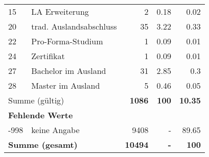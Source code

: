 \begin{longtable}{lXrrr}
     15 &
     \multicolumn{1}{X}{ LA Erweiterung   } &


       \num{2} &
       \num[round-mode=places,round-precision=2]{0.18} &
         \num[round-mode=places,round-precision=2]{0.02} \\

     20 &
     \multicolumn{1}{X}{ trad. Auslandsabschluss   } &


       \num{35} &
       \num[round-mode=places,round-precision=2]{3.22} &
         \num[round-mode=places,round-precision=2]{0.33} \\

     22 &
     \multicolumn{1}{X}{ Pro-Forma-Studium   } &


       \num{1} &
       \num[round-mode=places,round-precision=2]{0.09} &
         \num[round-mode=places,round-precision=2]{0.01} \\

     24 &
     \multicolumn{1}{X}{ Zertifikat   } &


       \num{1} &
       \num[round-mode=places,round-precision=2]{0.09} &
         \num[round-mode=places,round-precision=2]{0.01} \\

     27 &
     \multicolumn{1}{X}{ Bachelor im Ausland   } &


       \num{31} &
       \num[round-mode=places,round-precision=2]{2.85} &
         \num[round-mode=places,round-precision=2]{0.3} \\

     28 &
     \multicolumn{1}{X}{ Master im Ausland   } &


       \num{5} &
       \num[round-mode=places,round-precision=2]{0.46} &
         \num[round-mode=places,round-precision=2]{0.05} \\
     \midrule
     \multicolumn{2}{l}{Summe (gültig)} &
       \textbf{\num{1086}} &
     \textbf{\num{100}} &
       \textbf{\num[round-mode=places,round-precision=2]{10.35}} \\
     \multicolumn{5}{l}{\textbf{Fehlende Werte}}\\
       -998 &
       keine Angabe &
         \num{9408} &
        - &
         \num[round-mode=places,round-precision=2]{89.65} \\
     \midrule
     \multicolumn{2}{l}{\textbf{Summe (gesamt)}} &
          \textbf{\num{10494}} &
        \textbf{-} &
        \textbf{\num{100}} \\
     \bottomrule
     \end{longtable}
     
